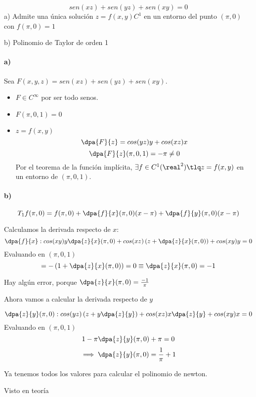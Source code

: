 
\begin{problem}[15]
\[sen(xz)+sen(yz)+sen(xy) = 0\]
a) Admite una única solución $z=f(x,y) C^1$ en un entorno del punto $(\pi,0)$ con $f(\pi,0) = 1$

b) Polinomio de Taylor de orden 1

\solution
\paragraph{a)}
Sea $F(x,y,z) = sen(xz)+sen(yz)+sen(xy)$.
\begin{itemize}
\item $F \in C^{\infty}$ por ser todo senos.
\item $F(\pi,0,1) = 0$
\item $z = f(x,y)$
\[\dpa{F}{z} = cos(yz)y + cos(xz)x\]
\[\dpa{F}{z}(\pi,0,1) = -\pi \neq 0\]
Por el teorema de la función implícita, $\exists f \in C^1(\real^2) \tlq z = f(x,y)$ en un entorno de $(\pi,0,1)$.
\end{itemize}
\paragraph{b)}
\[T_1f(\pi,0) =  f(\pi,0) + \dpa{f}{x}(\pi,0)(x-\pi) + \dpa{f}{y}(\pi,0)(x-\pi)\]

Calculamos la derivada respecto de $x$:
\[\dpa{f}{x} : cos(xy)y\dpa{z}{x}(\pi,0) + cos(xz)\left(z+\dpa{z}{x}(\pi,0)\right) + cos(xy)y = 0\]
Evaluando en $(\pi,0,1)$
\[= -\left(1+\dpa{z}{x}(\pi,0)\right) = 0 \equiv \dpa{z}{x}(\pi,0) = -1\]

Hay algún error, porque
$ \dpa{z}{x}(\pi,0) = \frac{-1}{\pi}$

Ahora vamos a calcular la derivada respecto de $y$

\[\dpa{z}{y}(\pi,0): cos(yz)\left(z+y\dpa{z}{y}\right) + cos(xz)x\dpa{z}{y} + cos(xy)x = 0\]
Evaluando en $(\pi,0,1)$
\[1-\pi\dpa{z}{y}(\pi,0) + \pi = 0\]
\[\implies \dpa{z}{y}(\pi,0)= \frac{1}{\pi} + 1\]

Ya tenemos todos los valores para calcular el polinomio de newton.
\end{problem}
 
  \begin{problem}[16]
 \solution
 Visto en teoría
 \end{problem}
 
